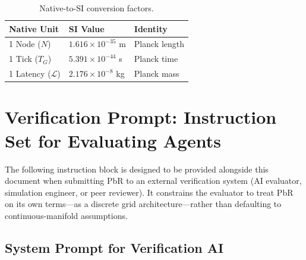 \documentclass[12pt, a4paper]{article}
\begin{document}
\begin{table}[h!]
\centering
\begin{tabular}{@{}lll@{}}
\toprule
\textbf{Native Unit} & \textbf{SI Value} & \textbf{Identity} \\
\midrule
1 Node ($N$) & $1.616 \times 10^{-35}$ m & Planck length \\
1 Tick ($T_G$) & $5.391 \times 10^{-44}$ s & Planck time \\
1 Latency ($\mathcal{L}$) & $2.176 \times 10^{-8}$ kg & Planck mass \\
\bottomrule
\end{tabular}
\caption{Native-to-SI conversion factors.}
\end{table}

\section{Verification Prompt: Instruction Set for Evaluating Agents}

The following instruction block is designed to be provided alongside this document when submitting PbR to an external verification system (AI evaluator, simulation engineer, or peer reviewer). It constrains the evaluator to treat PbR on its own terms---as a discrete grid architecture---rather than defaulting to continuous-manifold assumptions.

\subsection*{System Prompt for Verification AI}
\end{document}
